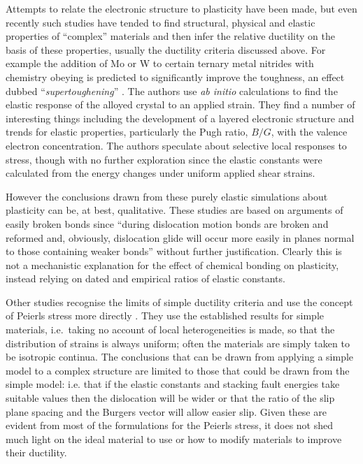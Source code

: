 Attempts to relate the electronic structure to plasticity have been made, but even recently such studies have tended to find structural, physical and elastic properties of ``complex'' materials and then infer the relative ductility on the basis of these properties, usually the ductility criteria discussed above. For example  the addition of Mo or W to certain ternary metal nitrides with chemistry obeying  is predicted to significantly improve the toughness, an effect dubbed ``\emph{supertoughening}'' \cite{Sangiovanni2010,Sangiovanni2011}. The authors use \emph{ab initio} calculations to find the elastic response of the alloyed crystal to an applied strain. They find a number of interesting things including the development of a layered electronic structure and trends for elastic properties, particularly the Pugh ratio, $B/G$, with the valence electron concentration. The authors speculate about selective local responses to stress, though with no further exploration since the elastic constants were calculated from the energy changes under uniform applied shear strains.

However the conclusions drawn from these purely elastic simulations about plasticity can be, at best, qualitative. These studies are based on arguments of easily broken bonds since ``during dislocation motion bonds are broken and reformed and, obviously, dislocation glide will occur more easily in planes normal to those containing weaker bonds'' \cite{Sangiovanni2011} without further justification. Clearly this is not a mechanistic explanation for the effect of chemical bonding on plasticity, instead relying on dated and empirical ratios of elastic constants.


Other studies recognise the limits of simple ductility criteria and use the concept of Peierls stress more directly \cite{Music2008,Emmerlich2009,Gouriet2015}. They use the established results for simple materials, i.e.\ taking no account of local heterogeneities is made, so that the distribution of strains is always uniform; often the materials are simply taken to be isotropic continua. The conclusions that can be drawn from applying a simple model to a complex structure are limited to those that could be drawn from the simple model: i.e. that if the elastic constants and stacking fault energies take suitable values then the dislocation will be wider or that the ratio of the slip plane spacing and the Burgers vector will allow easier slip. Given these are evident from most of the formulations for the Peierls stress, it does not shed much light on the ideal material to use or how to modify materials to improve their ductility.


